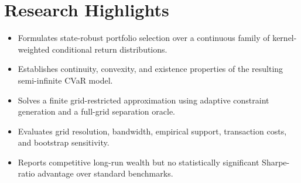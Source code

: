 \documentclass[11pt, a4paper]{article}
\begin{document}
\section*{Research Highlights}
\begin{itemize}
    \item Formulates state-robust portfolio selection over a continuous family of kernel-weighted conditional return distributions.
    \item Establishes continuity, convexity, and existence properties of the resulting semi-infinite CVaR model.
    \item Solves a finite grid-restricted approximation using adaptive constraint generation and a full-grid separation oracle.
    \item Evaluates grid resolution, bandwidth, empirical support, transaction costs, and bootstrap sensitivity.
    \item Reports competitive long-run wealth but no statistically significant Sharpe-ratio advantage over standard benchmarks.
\end{itemize}
\end{document}
